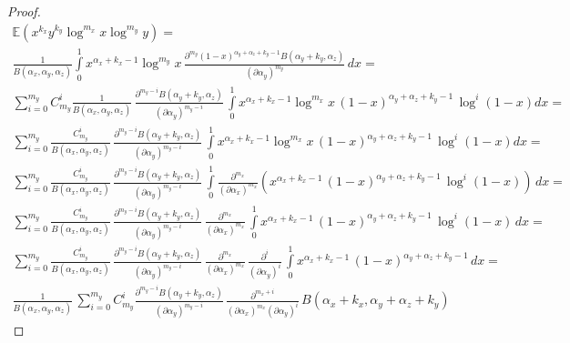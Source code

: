 \documentclass{article}
\begin{document}
\begin{theorem}
\begin{proof}
		\begin{multline*}
		\mathbb{E}(x^{k_x} y^{k_y} \log^{m_x} x \log^{m_y} y) = \\ \frac{1}{B(\alpha_x, \alpha_y, \alpha_z)} \int\limits_0^1 { x^{\alpha_x + k_x - 1} \log^{m_y}{x} \, \frac{\partial^{m_y} (1 - x)^{\alpha_y + \alpha_z + k_y - 1} B(\alpha_y + k_y, \alpha_z)}{(\partial \alpha_y)^{m_y}} \, dx } = 
		\\ \sum_{i=0}^{m_y}{ C^i_{m_y} \frac{1}{B(\alpha_x, \alpha_y, \alpha_z)} \, \frac{\partial^{m_y-i} B(\alpha_y + k_y, \alpha_z)}{(\partial \alpha_y)^{m_y-i}} \, \int\limits_0^1 { x^{\alpha_x + k_x - 1} \log^{m_x}{x} \, (1 - x)^{\alpha_y + \alpha_z + k_y - 1} \, \log^i{(1 - x)} dx }} = 
		\\ \sum_{i=0}^{m_y}{ \frac{C^i_{m_y}}{B(\alpha_x, \alpha_y, \alpha_z)} \, \frac{\partial^{m_y-i} B(\alpha_y + k_y, \alpha_z)}{(\partial \alpha_y)^{m_y-i}} \, \int\limits_0^1 { x^{\alpha_x + k_x - 1} \log^{m_x}{x} \, (1 - x)^{\alpha_y + \alpha_z + k_y - 1} \, \log^i{(1 - x)} dx }} = 
		\\ \sum_{i=0}^{m_y}{ \frac{C^i_{m_y}}{B(\alpha_x, \alpha_y, \alpha_z)} \, \frac{\partial^{m_y-i} B(\alpha_y + k_y, \alpha_z)}{(\partial \alpha_y)^{m_y-i}} \, \int\limits_0^1 { \frac{\partial^{m_x}}{(\partial \alpha_x)^{m_x}} (x^{\alpha_x + k_x - 1} \, (1 - x)^{\alpha_y + \alpha_z + k_y - 1} \, \log^i{(1 - x)}) \, dx }} = 
		\\ \sum_{i=0}^{m_y}{ \frac{C^i_{m_y}}{B(\alpha_x, \alpha_y, \alpha_z)} \, \frac{\partial^{m_y-i} B(\alpha_y + k_y, \alpha_z)}{(\partial \alpha_y)^{m_y-i}} \, \frac{\partial^{m_x}}{(\partial \alpha_x)^{m_x}} \, \int\limits_0^1 {x^{\alpha_x + k_x - 1} \, (1 - x)^{\alpha_y + \alpha_z + k_y - 1} \, \log^i{(1 - x)} \, dx }} = 
		\\ \sum_{i=0}^{m_y}{ \frac{C^i_{m_y}}{B(\alpha_x, \alpha_y, \alpha_z)} \, \frac{\partial^{m_y-i} B(\alpha_y + k_y, \alpha_z)}{(\partial \alpha_y)^{m_y-i}} \, \frac{\partial^{m_x}}{(\partial \alpha_x)^{m_x}} \,
			\frac{\partial^{i}}{(\partial \alpha_y)^{i}} \, \int\limits_0^1 {x^{\alpha_x + k_x - 1} \, (1 - x)^{\alpha_y + \alpha_z + k_y - 1} \, dx }} = 
		\\ \frac{1}{B(\alpha_x, \alpha_y, \alpha_z)} \,  \sum_{i=0}^{m_y}{ C^i_{m_y} \frac{\partial^{m_y-i} B(\alpha_y + k_y, \alpha_z)}{(\partial \alpha_y)^{m_y-i}} \, \frac{\partial^{m_x + i}}{(\partial \alpha_x)^{m_x} (\partial \alpha_y)^{i}} \, B(\alpha_x + k_x, \alpha_y + \alpha_z + k_y)}
		\end{multline*}
	\end{proof}
\end{theorem}
\end{document}

